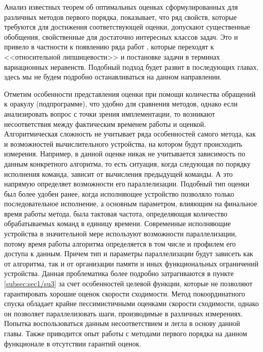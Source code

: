   Анализ известных теорем об оптимальных оценках сформулированных для различных методов первого порядка, показывает, что ряд свойств, которые требуются для достижения соответствующей оценки, допускают существенные обобщения, свойственные для достаточно интересных классов задач. Это и привело в частности к появлению ряда работ \cite{Dragomir, Lu_2018, Lu_Nesterov_2018, Fedor_relative_adapuniv}, которые переходят к <<относительной липшицевости>> и постановке задачи в терминах вариационных неравенств. Подобный подход будет развит в последующих главах, здесь мы не будем подробно останавливаться на данном направлении.

  Отметим особенности представления оценки при помощи количества обращений к оракулу (подпрограмме), что удобно для сравнения методов, однако если анализировать вопрос с точки зрения имплементации, то возникают несоответствия между фактическим временем работы и оценкой. Алгоритмическая сложность не учитывает ряда особенностей самого метода, как и возможностей вычислительного устройства, на котором будут происходить измерения. Например, в данной оценке никак не учитывается зависимость по данным конкретного алгоритма, то есть ситуация, когда следующая по порядку исполнения команда, зависит от вычисления предыдущей команды. А это напрямую определяет возможности его параллелизации. Подобный тип оценки был более удобен ранее, когда исполняющее устройство позволяло только последовательное исполнение, а основным параметром, влияющим на финальное время работы метода, была тактовая частота, определяющая количество обрабатываемых команд в единицу времени. Современные исполняющие устройства в значительной мере используют возможности параллелизации, потому время работы алгоритма определяется в том числе и профилем его доступа к данным. Причем тип и параметры параллелизации будут зависеть как от алгоритма, так и от организации памяти и иных функциональных ограничений устройства. Данная проблематика более подробно затрагиваются в пункте \ref{subsec:sec1/su3} за счет особенностей целевой функции, которые не позволяют гарантировать хорошие оценок скорости сходимости.  Метод покоординатного спуска обладает крайне пессимистичными оценками скорости сходимости, однако он позволяет параллелизовать шаги, производимые в различных измерениях. Попытка воспользоваться данным несоответствием и легла в основу данной главы. Также приводится опыт работы с методами первого порядка на данном функционале в отсутствии гарантий оценок. 


